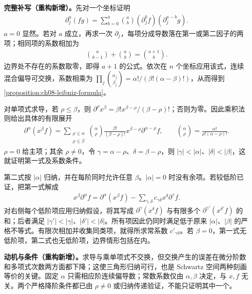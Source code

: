 \documentclass[../../main.tex]{subfiles}
\begin{document}
\begin{solution}
\textbf{完整补写（重构新增）。}先对一个坐标证明
\begin{align*}
\partial_j^a(fg)=\sum_{b=0}^a\binom ab(\partial_j^bf)(\partial_j^{a-b}g).
\end{align*}
$a=0$ 显然。若对 $a$ 成立，再求一次 $\partial_j$，每项分成导数落在第一或第二因子的两项；相同项的系数相加为
\begin{align*}
\binom a{b-1}+\binom ab=\binom{a+1}b.
\end{align*}
边界处不存在的系数取零，即得 $a+1$ 的公式。依次在 $n$ 个坐标应用该式，连续混合偏导可交换，系数相乘为
$\prod_j\binom{\alpha_j}{\beta_j}=\alpha!/(\beta!(\alpha-\beta)!)$，从而得到\cref{proposition:ch08-leibniz-formula}。

对单项式求导，若 $\rho\leqslant\beta$，则 $\partial^\rho x^\beta=\beta!x^{\beta-\rho}/(\beta-\rho)!$；否则为零。因此乘积法则给出具体的有限展开
\begin{align*}
\partial^\alpha(x^\beta f)=
\sum_{\substack{\rho\leqslant\alpha\\\rho\leqslant\beta}}
\binom\alpha\rho\frac{\beta!}{(\beta-\rho)!}
 x^{\beta-\rho}\partial^{\alpha-\rho}f,
\qquad \binom\alpha\rho=\frac{\alpha!}{\rho!(\alpha-\rho)!}.
\end{align*}
$\rho=0$ 给主项；其余 $\rho\ne0$，令 $\gamma=\alpha-\rho$、$\delta=\beta-\rho$，则 $|\gamma|<|\alpha|$、$|\delta|<|\beta|$，这就证明第一式及系数条件。

第二式按 $|\alpha|$ 归纳，并在每阶同时允许任意 $\beta$。$|\alpha|=0$ 时没有余项。若较低阶已证，把第一式解成
\begin{align*}
x^\beta\partial^\alpha f=\partial^\alpha(x^\beta f)
-\sum_{\gamma,\delta}c_{\gamma\delta}x^\delta\partial^\gamma f.
\end{align*}
对右侧每个低阶项应用归纳假设，将其写成 $\partial^\gamma(x^\delta f)$ 与有限多个 $\partial^{\gamma'}(x^{\delta'}f)$ 的和；后者满足 $|\gamma'|<|\gamma|$、$|\delta'|<|\delta|$。所有项因此仍同时满足低于原来 $|\alpha|$、$|\beta|$ 的严格不等式。有限次相加并收集同类项，就得所求常系数 $c'_{\gamma\delta}$。若 $\beta=0$，第一式无低阶项，第二式也无低阶项，边界情形包括在内。
\end{solution}
\begin{remark}
\textbf{动机与条件（重构新增）。}求导与乘单项式不交换，但交换产生的误差在微分阶数和多项式次数两方面都下降；这使三角形归纳可行，也是 Schwartz 空间两种刻画等价的关键。固定 $\alpha$ 只需相应阶连续偏导数；常数系数仅由 $\alpha,\beta$ 决定，与 $x,f$ 无关。两个严格降阶条件都已由 $\rho\ne0$ 或归纳传递验证，不能只证明其中一个。
\end{remark}
\end{document}
